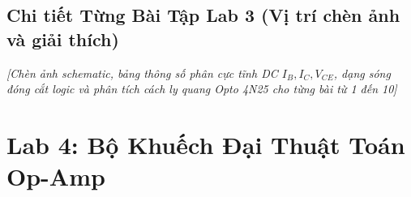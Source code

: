 \documentclass[12pt,a4paper]{report}
\begin{document}
\begin{orangebox}
\centering
\vspace{0.3cm}
\vspace{0.3cm}
\end{orangebox}

\subsection*{Chi tiết Từng Bài Tập Lab 3 (Vị trí chèn ảnh và giải thích)}
\begin{orangebox}
\textit{\color{guidegray}[Chèn ảnh schematic, bảng thông số phân cực tĩnh DC $I_B, I_C, V_{CE}$, dạng sóng đóng cắt logic và phân tích cách ly quang Opto 4N25 cho từng bài từ 1 đến 10]}
\end{orangebox}

\section{Lab 4: Bộ Khuếch Đại Thuật Toán Op-Amp}
\end{document}
